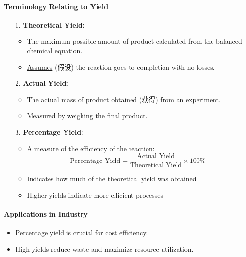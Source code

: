\paragraph{Terminology Relating to Yield}
\begin{itemize}
    \item[1.] \textbf{Theoretical Yield:}
    \begin{itemize}
        \item The maximum possible amount of product calculated from the balanced chemical equation.
        \item \underline{Assumes} (假设) the reaction goes to completion with no losses.
    \end{itemize}
    \item[2.] \textbf{Actual Yield:}
    \begin{itemize}
        \item The actual mass of product \underline{obtained} (获得) from an experiment.
        \item Measured by weighing the final product.
    \end{itemize}
    \item[3.] \textbf{Percentage Yield:}
    \begin{itemize}
        \item A measure of the efficiency of the reaction:
        \begin{equation}
            \text{Percentage Yield} = \frac{\text{Actual Yield}}{\text{Theoretical Yield}} \times 100\%
        \end{equation}
        \item Indicates how much of the theoretical yield was obtained.
        \item Higher yields indicate more efficient processes.
    \end{itemize}
\end{itemize}

\paragraph{Applications in Industry}
\begin{itemize}
    \item Percentage yield is crucial for cost efficiency.
    \item High yields reduce waste and maximize resource utilization.
\end{itemize}